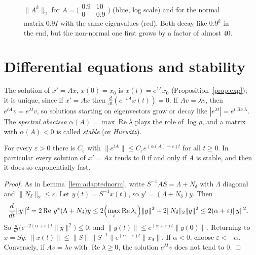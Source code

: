 \begin{figure}[ht]
\centering
{}
\caption{$\|A^k\|_2$ for $A=\bigl(\begin{smallmatrix}0.9&10\\0&0.9\end{smallmatrix}\bigr)$ (blue, log scale) and for the normal matrix
$0.9I$ with the same eigenvalues (red). Both decay like $0.9^k$ in the end, but the non-normal one first grows by a factor of almost
$40$.}
\label{fig:transient}
\end{figure}

\section{Differential equations and stability}

The solution of $x'=Ax$, $x(0)=x_0$ is $x(t)=e^{tA}x_0$ (Proposition~\ref{prop:exp}); it is unique, since if $x'=Ax$ then
$\frac d{dt}(e^{-tA}x(t))=0$. If $Av=\lambda v$, then $e^{tA}v=e^{\lambda t}v$, so solutions starting on eigenvectors grow or decay
like $|e^{\lambda t}|=e^{t\operatorname{Re}\lambda}$. The \emph{spectral abscissa} $\alpha(A)=\max\operatorname{Re}\lambda$ plays the
role of $\log\rho$, and a matrix with $\alpha(A)<0$ is called \emph{stable} (or \emph{Hurwitz}).

\begin{theorem}[stability]\label{thm:stability}
For every $\varepsilon>0$ there is $C_\varepsilon$ with $\|e^{tA}\|\le C_\varepsilon e^{(\alpha(A)+\varepsilon)t}$ for all $t\ge0$. In
particular every solution of $x'=Ax$ tends to $0$ if and only if $A$ is stable, and then it does so exponentially fast.
\end{theorem}
\begin{proof}
As in Lemma~\ref{lem:adaptednorm}, write $S^{-1}AS=\Lambda+N_\delta$ with $\Lambda$ diagonal and $\|N_\delta\|_2\le\varepsilon$. Let
$y(t)=S^{-1}x(t)$, so $y'=(\Lambda+N_\delta)y$. Then
\[
\frac d{dt}\|y\|^2=2\operatorname{Re}\,y^*(\Lambda+N_\delta)y\le2\Bigl(\max_i\operatorname{Re}\lambda_i\Bigr)\|y\|^2+2\|N_\delta\|_2\|y\|^2\le
2(\alpha+\varepsilon)\|y\|^2.
\]
So $\frac d{dt}\bigl(e^{-2(\alpha+\varepsilon)t}\|y\|^2\bigr)\le0$, and $\|y(t)\|\le e^{(\alpha+\varepsilon)t}\|y(0)\|$. Returning to $x=Sy$,
$\|x(t)\|\le\|S\|\|S^{-1}\|e^{(\alpha+\varepsilon)t}\|x_0\|$. If $\alpha<0$, choose $\varepsilon<-\alpha$. Conversely, if $Av=\lambda v$ with
$\operatorname{Re}\lambda\ge0$, the solution $e^{\lambda t}v$ does not tend to $0$.
\end{proof}

